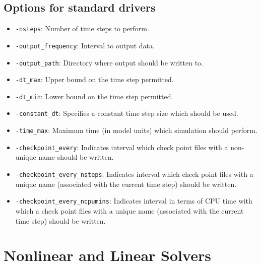 \documentclass[paper=a4, fontsize=11pt,twoside]{scrartcl}
\newcommand{\unix}[1]{\texttt{\footnotesize #1}}
\begin{document}
{{\subsection{Options for standard drivers}
\begin{itemize}
	\item \unix{-nsteps}: Number of time steps to perform.
	\item \unix{-output\_frequency}: Interval to output data.
	\item \unix{-output\_path}: Directory where output should be written to.
	\item \unix{-dt\_max}: Upper bound on the time step permitted.
	\item \unix{-dt\_min}: Lower bound on the time step permitted.
	\item \unix{-constant\_dt}: Specifies a constant time step size which should be used.
	\item \unix{-time\_max}: Maximum time (in model units) which simulation should perform.
	\item \unix{-checkpoint\_every}: Indicates interval which check point files with a non-unique name should be written.
	\item \unix{-checkpoint\_every\_nsteps}: Indicates interval which check point files with a unique name (associated with the current time step) should be written.
	\item \unix{-checkpoint\_every\_ncpumins}: Indicates interval in terms of CPU time with which a check point files with a unique name (associated with the current time step) should be written.
\end{itemize}


\newpage
\section{Nonlinear and Linear Solvers}

}}
\end{document}
